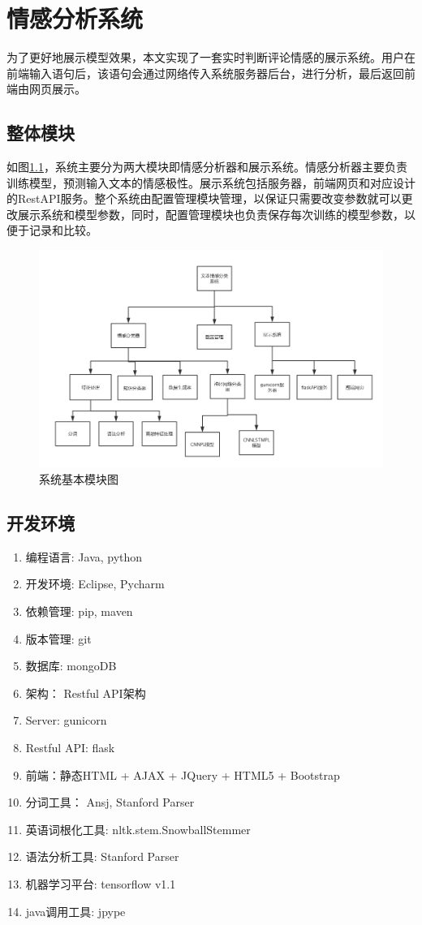 \chapter{情感分析系统}\thispagestyle{fancy}
为了更好地展示模型效果，本文实现了一套实时判断评论情感的展示系统。用户在前端输入语句后，该语句会通过网络传入系统服务器后台，进行分析，最后返回前端由网页展示。
\section{整体模块}
如图\ref{fmodule}，系统主要分为两大模块即情感分析器和展示系统。情感分析器主要负责训练模型，预测输入文本的情感极性。展示系统包括服务器，前端网页和对应设计的RestAPI服务。整个系统由配置管理模块管理，以保证只需要改变参数就可以更改展示系统和模型参数，同时，配置管理模块也负责保存每次训练的模型参数，以便于记录和比较。
\begin{center}
\begin{figure}[!hbp]
\includegraphics[width=\textwidth]{graphic/module.png}
\caption{系统基本模块图 \label{fmodule}}
\end{figure}
\end{center}
\section{开发环境}
\begin{enumerate}
\item 编程语言: Java, python
\item 开发环境: Eclipse, Pycharm
\item 依赖管理: pip, maven
\item 版本管理: git
\item 数据库: mongoDB
\item 架构： Restful API架构
\item Server: gunicorn
\item Restful API: flask
\item 前端：静态HTML + AJAX + JQuery + HTML5 + Bootstrap
\item 分词工具： Ansj, Stanford Parser
\item 英语词根化工具: nltk.stem.SnowballStemmer
\item 语法分析工具: Stanford Parser
\item 机器学习平台: tensorflow v1.1
\item java调用工具: jpype
\end{enumerate}